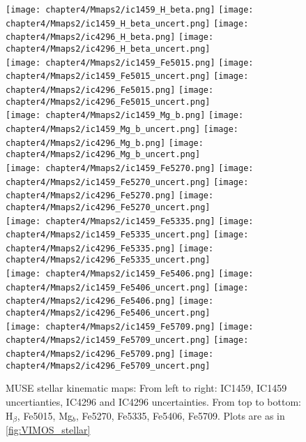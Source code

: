 \begin{figure*}
	\centering
	\texttt{[image: chapter4/Mmaps2/ic1459\_H\_beta.png]}
	\texttt{[image: chapter4/Mmaps2/ic1459\_H\_beta\_uncert.png]}
	\texttt{[image: chapter4/Mmaps2/ic4296\_H\_beta.png]}
	\texttt{[image: chapter4/Mmaps2/ic4296\_H\_beta\_uncert.png]}
	\\
	\texttt{[image: chapter4/Mmaps2/ic1459\_Fe5015.png]}
	\texttt{[image: chapter4/Mmaps2/ic1459\_Fe5015\_uncert.png]}
	\texttt{[image: chapter4/Mmaps2/ic4296\_Fe5015.png]}
	\texttt{[image: chapter4/Mmaps2/ic4296\_Fe5015\_uncert.png]}
	\\
	\texttt{[image: chapter4/Mmaps2/ic1459\_Mg\_b.png]}
	\texttt{[image: chapter4/Mmaps2/ic1459\_Mg\_b\_uncert.png]}
	\texttt{[image: chapter4/Mmaps2/ic4296\_Mg\_b.png]}
	\texttt{[image: chapter4/Mmaps2/ic4296\_Mg\_b\_uncert.png]}
	\\
	\texttt{[image: chapter4/Mmaps2/ic1459\_Fe5270.png]}
	\texttt{[image: chapter4/Mmaps2/ic1459\_Fe5270\_uncert.png]}
	\texttt{[image: chapter4/Mmaps2/ic4296\_Fe5270.png]}
	\texttt{[image: chapter4/Mmaps2/ic4296\_Fe5270\_uncert.png]}
	\\
	\texttt{[image: chapter4/Mmaps2/ic1459\_Fe5335.png]}
	\texttt{[image: chapter4/Mmaps2/ic1459\_Fe5335\_uncert.png]}
	\texttt{[image: chapter4/Mmaps2/ic4296\_Fe5335.png]}
	\texttt{[image: chapter4/Mmaps2/ic4296\_Fe5335\_uncert.png]}
	\\
	\texttt{[image: chapter4/Mmaps2/ic1459\_Fe5406.png]}
	\texttt{[image: chapter4/Mmaps2/ic1459\_Fe5406\_uncert.png]}
	\texttt{[image: chapter4/Mmaps2/ic4296\_Fe5406.png]}
	\texttt{[image: chapter4/Mmaps2/ic4296\_Fe5406\_uncert.png]}
	\\
	\texttt{[image: chapter4/Mmaps2/ic1459\_Fe5709.png]}
	\texttt{[image: chapter4/Mmaps2/ic1459\_Fe5709\_uncert.png]}
	\texttt{[image: chapter4/Mmaps2/ic4296\_Fe5709.png]}
	\texttt{[image: chapter4/Mmaps2/ic4296\_Fe5709\_uncert.png]}
	\\
	\caption[MUSE absorption line strength maps]{MUSE stellar kinematic maps: From left to right: IC1459, IC1459 uncertianties, IC4296 and IC4296 uncertainties. From top to bottom: H$_\beta$, Fe5015, Mg$_b$, Fe5270, Fe5335, Fe5406, Fe5709. Plots are as in \ref{fig:VIMOS_stellar}}
	\label{fig:MUSE_absorption}
\end{figure*}

